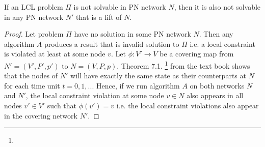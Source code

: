 \begin{theorem} \label{thm:lcl_unsolvability:2}
If an LCL problem $\Pi$ is not solvable in PN network $N$, then it is also not solvable in any PN network $N'$ that is a lift of $N$.
\end{theorem}
\begin{proof}
    Let problem $\Pi$ have no solution in some PN network $N$.
    Then any algorithm $A$ produces a result that is invalid solution to $\Pi$ i.e. a local constraint is violated at least at some node $v$.
    Let $\phi: V' \rightarrow V$ be a covering map from $N'=(V', P', p')$ to $N=(V, P, p)$.
    Theorem 7.1. \footnote{} from the text book \cite{HirvonenSuomelaDistAlg2020} shows that the nodes of $N'$ will have exactly the same state as their counterparts at $N$ for each time unit $t=0,1,...$
    Hence, if we run algorithm $A$ on both networks $N$ and $N'$, the local constraint violation at some node $v \in N$ also appears in all nodes $v' \in V'$ such that $\phi(v') = v$ i.e. the local constraint violations also appear in the covering network $N'$.
\end{proof}


